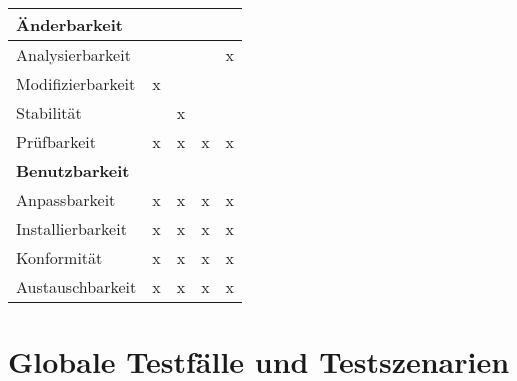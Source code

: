 \documentclass[parskip=full,11pt]{scrartcl}
\begin{document}
\begin{table}[H]
\begin{center}
\begin{tabularx}{\textwidth}{X c c c c}
	  \hline	  	
	  \multicolumn{5}{l}{\textbf{Änderbarkeit}}\\
      \hline
      Analysierbarkeit &   &   &   & x\\
	  Modifizierbarkeit & x &   &   &  \\
	  Stabilität &   & x &   &  \\
	  Prüfbarkeit & x & x & x & x\\
	  
	  \hline	  	
	  \multicolumn{5}{l}{\textbf{Benutzbarkeit}}\\
      \hline
      Anpassbarkeit & x & x & x & x\\
	  Installierbarkeit & x & x & x & x\\
	  Konformität & x & x & x & x\\
	  Austauschbarkeit & x & x & x & x\\
	  
	  \hline      			
    \end{tabularx}
  \end{center}
  
\end{table}
\renewcommand{\arraystretch}{1}
\section{Globale Testfälle und Testszenarien}

\newpage
\printglossary	
\end{document}
